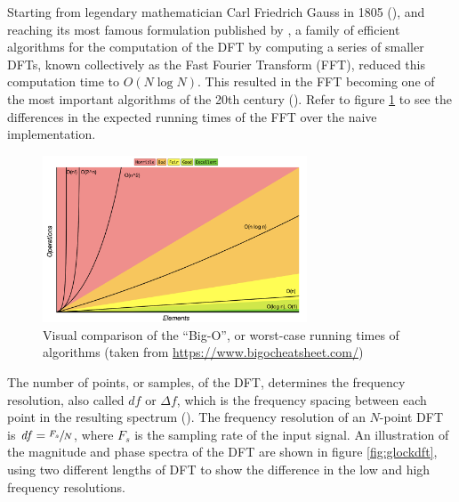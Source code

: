 \documentclass[report.tex]{subfiles}
\begin{document}
Starting from legendary mathematician Carl Friedrich Gauss in 1805 (\cite{gausshist}), and reaching its most famous formulation published by \textcite{cooleytukey}, a family of efficient algorithms for the computation of the DFT by computing a series of smaller DFTs, known collectively as the Fast Fourier Transform (FFT), reduced this computation time to $O(N \log{N})$. This resulted in the FFT becoming one of the most important algorithms of the 20th century (\cite{ffttopten, fiftyyears}). Refer to figure \ref{fig:bigo} to see the differences in the expected running times of the FFT over the naive implementation.

\begin{figure}[ht]
	\centering
	\includegraphics[width=0.7\textwidth]{./images-misc/bigo.png}
	\caption{Visual comparison of the ``Big-O'', or worst-case running times of algorithms (taken from \url{https://www.bigocheatsheet.com/})}
	\label{fig:bigo}
\end{figure}

The number of points, or samples, of the DFT, determines the frequency resolution, also called $\mathit{df}$ or $\mathit{\Delta f}$, which is the frequency spacing between each point in the resulting spectrum (\cite{discretebook}). The frequency resolution of an $N$-point DFT is $\mathit{df} = \sfrac{F_{s}}{N}$, where $F_{s}$ is the sampling rate of the input signal. An illustration of the magnitude and phase spectra of the DFT are shown in figure \ref{fig:glockdft}, using two different lengths of DFT to show the difference in the low and high frequency resolutions.
\end{document}

